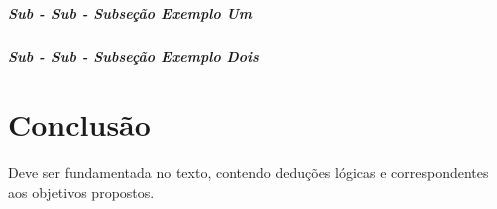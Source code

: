 \documentclass[
  12pt,		%
  a4paper,	%
  openright,%
  oneside,	%
  chapter=TITLE,		%
  section=TITLE,		%
  english,	%
  french,	%
  spanish,	%
  brazil
]{abntex2}
\begin{document}
                        \paragraph{Sub - Sub - Subseção Exemplo Um}
                        \lipsum[11]
                        
                        \paragraph{Sub - Sub - Subseção Exemplo Dois}
                        \lipsum[13]

    \chapter{Conclusão}
    
        Deve ser fundamentada no texto, contendo deduções lógicas e correspondentes aos objetivos propostos.
    
    
    \postextual
    
    
    
    
    
\end{document}
